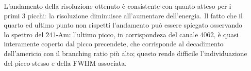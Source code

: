 \documentclass[a4paper,10pt]{article}
\begin{document}
L'andamento della risoluzione ottenuto \`e consistente con quanto atteso per i primi 3 picchi: la risoluzione diminuisce all'aumentare dell'energia. Il fatto che il quarto ed ultimo punto non rispetti l'andamento pu\`o essere spiegato osservando lo spettro del 241-Am: l'ultimo picco, in corrispondeza del canale 4062, \`e quasi interamente coperto dal picco precendete, che corrisponde al decadimento dell'americio con il branching ratio più alto; questo rende difficile l'individuazione del picco stesso e della FWHM associata. 
\end{document}
